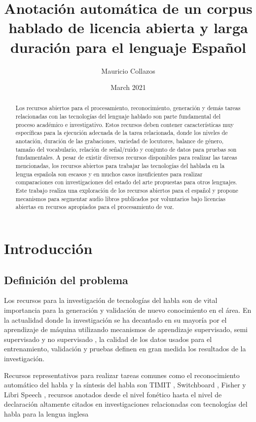 \documentclass[a4paper,12pt,twoside]{report}
\title{Anotación automática de un corpus hablado de licencia abierta y larga duración para el lenguaje Español}
\author{Mauricio Collazos}
\date{March 2021}
\begin{document}
\maketitle

\begin{abstract}
    Los recursos abiertos para el procesamiento, reconocimiento, generación y demás tareas relacionadas con las tecnologías del lenguaje hablado son parte fundamental del proceso académico e investigativo. Estos recursos deben contener características muy específicas para la ejecución adecuada de la tarea relacionada, donde los niveles de anotación, duración de las grabaciones, variedad de locutores, balance de género, tamaño del vocabulario, relación de señal/ruido y conjunto de datos para pruebas son fundamentales. A pesar de existir diversos recursos disponibles para realizar las tareas mencionadas, los recursos abiertos para trabajar las tecnologías del hablada en la lengua española son escasos y en muchos casos insuficientes para realizar comparaciones con investigaciones del estado del arte propuestas para otros lenguajes. Este trabajo realiza una exploración de los recursos abiertos para el español y propone mecanismos para segmentar audio libros publicados por voluntarios bajo licencias abiertas en recursos apropiados para el procesamiento de voz.
\end{abstract}


\chapter{Introducción}

\section{Definición del problema}

Los recursos para la investigación de tecnologías del habla son de vital importancia para la generación y validación de nuevo conocimiento en el área. En la actualidad donde la investigación se ha decantado en su mayoría por el aprendizaje de máquina utilizando mecanismos de aprendizaje supervisado, semi supervisado y no supervisado \cite{Chiu2018} \cite{AmazonSemiSupervised}  \cite{ZeroResources} , la calidad de los datos usados para el entrenamiento, validación y pruebas definen en gran medida los resultados de la investigación.

Recursos representativos para realizar tareas comunes como el reconocimiento automático del habla y la síntesis del habla son TIMIT \cite{PriceTheRecognition}, Switchboard \cite{Godfrey1992SWITCHBOARD:Development}, Fisher \cite{CieriTheSpeech-to-Text} y Libri Speech \cite{PanayotovLIBRISPEECH:BOOKS}, recursos anotados desde el nivel fonético hasta el nivel de declaración altamente citados en investigaciones relacionadas con tecnologías del habla para la lengua inglesa
\end{document}

